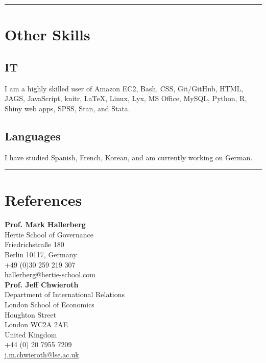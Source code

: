 \documentclass[a4paper]{article}
\begin{document}
{{\begin{itemize}
\end{itemize}

\vspace{0.5cm}
\medskip\hrule height 1pt
\vspace{0.5cm}

\section*{Other Skills}

\subsection*{IT}

I am a highly skilled user of Amazon EC2, Bash, CSS, Git/GitHub, HTML, JAGS, JavaScript, knitr, LaTeX, Linux, Lyx, MS Office, MySQL, Python, R, Shiny web apps, SPSS, Stan, and Stata.

\subsection*{Languages}

I have studied Spanish, French, Korean, and am currently working on German.


\vspace{0.5cm}
\medskip\hrule height 1pt
\vspace{0.5cm}

\section*{References}

\noindent \textbf{Prof. Mark Hallerberg} \\
Hertie School of Governance\\
Friedrichstra{\ss}e 180\\
Berlin 10117, Germany \\
+49 (0)30 259 219 307 \\
\href{mailto:hallerberg@hertie-school.com}{hallerberg@hertie-school.com}\\

\noindent \textbf{Prof. Jeff Chwieroth}\\
Department of International Relations \\
London School of Economics \\
Houghton Street \\
London WC2A 2AE \\
United Kingdom\\
+44 (0) 20 7955 7209\\
\href{mailto:j.m.chwieroth@lse.ac.uk}{j.m.chwieroth@lse.ac.uk}\\

}}
\end{document}
